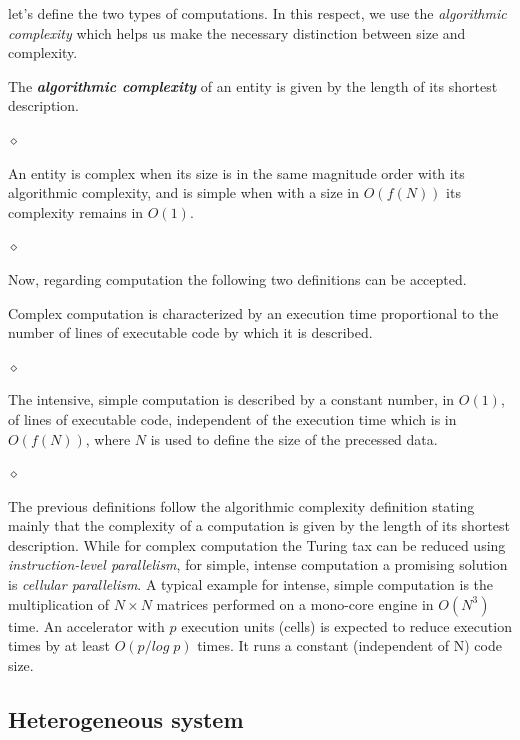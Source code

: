 let's define the two types of computations. In this respect, we use the {\em algorithmic complexity} \cite{Chaitin70} which helps us make the necessary distinction between size and complexity.

\begin{definition}
The {\bf {\em algorithmic complexity}} of an entity is given by the length of its shortest description.

$\diamond$
\end{definition}

\begin{definition}
An entity is complex when its size is in the same magnitude order with its algorithmic complexity, and is simple when with a size in $O(f(N))$ its complexity remains in $O(1)$.

$\diamond$
\end{definition}

Now, regarding computation the following two definitions can be accepted.

\begin{definition}
Complex computation is characterized by an execution time proportional to the number of lines of executable code by which it is described.

$\diamond$
\end{definition}

\begin{definition}
The intensive, simple computation is described by a constant number, in $O(1)$, of lines of executable code, independent of the execution time which is in $O(f(N))$, where $N$ is used to define the size of the precessed data.

$\diamond$
\end{definition}

The previous definitions follow the algorithmic complexity \cite{Chaitin70} definition stating  mainly that the complexity of a computation is given by the length of its shortest description. While for complex computation the Turing tax can be reduced using {\em instruction-level parallelism}, for simple, intense computation a promising solution is  {\em cellular parallelism}. A typical example for intense, simple computation is the multiplication of $N \times N$ matrices performed on a mono-core engine in $O(N^3)$ time. An accelerator with $p$ execution units (cells) is expected to reduce execution times by at least $O(p/log \; p)$ times. It runs a constant (independent of N) code size.

\subsection{Heterogeneous system}\label{hetCompSystem}

